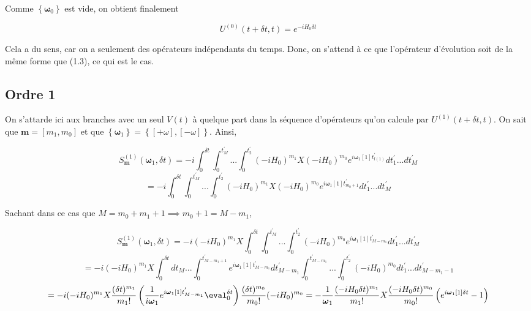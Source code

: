 Comme $\left\{\boldsymbol{\omega}_0\right\}$ est vide, on obtient finalement

\begin{equation}
    U^{(0)}(t+\delta t, t) = e^{-iH_0\delta t}
\end{equation}

Cela a du sens, car on a seulement des opérateurs indépendants du temps. Donc, on s'attend à ce que l'opérateur d'évolution soit de la même forme que (1.3), ce qui est le cas.

\subsection{Ordre 1}
On s'attarde ici aux branches avec un seul $V(t)$ à quelque part dans la séquence d'opérateurs qu'on calcule par $ U^{(1)}(t+\delta t, t)$. On sait que $\boldsymbol{m} = [m_1, m_0]$ et que $\left\{\boldsymbol{\omega}_1\right\} = \left\{[+\omega], [-\omega]\right\}$. Ainsi, 

\begin{equation*}
    S^{(1)}_{\boldsymbol{m}}(\boldsymbol{\omega}_1, \delta t) = -i\int_{0}^{\delta t}\int_{0}^{t_M^{'}}... \int_{0}^{t_2^{'}}(-iH_0)^{m_1}X(-iH_0)^{m_0} e^{i\boldsymbol{\omega}_1[1]t^{'}_{l(1)}}dt_1^{'} ... dt_M^{'}
\end{equation*}
\begin{equation*}
    = -i\int_{0}^{\delta t}\int_{0}^{t_M^{'}}... \int_{0}^{t_2^{'}}(-iH_0)^{m_1}X(-iH_0)^{m_0} e^{i\boldsymbol{\omega}_1[1]t^{'}_{m_0+1}}dt_1^{'} ... dt_M^{'}
\end{equation*}

Sachant dans ce cas que $M = m_0 + m_1 + 1 \implies m_0 + 1 = M-m_1$,

\begin{equation*}
    S^{(1)}_{\boldsymbol{m}}(\boldsymbol{\omega}_1, \delta t) = -i (-iH_0)^{m_1}X
    \int_{0}^{\delta t}\int_{0}^{t_M^{'}}... \int_{0}^{t_2^{'}}(-iH_0)^{m_0} e^{i\boldsymbol{\omega}_1[1]t^{'}_{M-m_1}}dt_1^{'} ... dt_M^{'}
\end{equation*}
\begin{equation*}
    = -i (-iH_0)^{m_1}X
    \int_{0}^{\delta t}dt_M ... \int_{0}^{t^{'}_{M-m_1+1}}e^{i\boldsymbol{\omega}_1[1]t^{'}_{M-m_1}} dt_{M-m_1}^{'}\int_{0}^{t^{'}_{M-m_1}}... \int_{0}^{t_2^{'}}(-iH_0)^{m_0} dt_1^{'} ... dt_{M - m_1 - 1}^{'}
\end{equation*}
\begin{equation*}
    = -i(-iH_0)^{m_1}X\frac{(\delta t)^{m_1}}{m_1!} \left(\frac{1}{i\boldsymbol{\omega}_1}e^{i\boldsymbol{\omega}_1[1]t^{'}_{M-m_1}}\eval_{0}^{\delta t}\right) \frac{(\delta t)^{m_0}}{m_0!}(-iH_0)^{m_0} = -\frac{1}{\boldsymbol{\omega}_1}\frac{(-i H_0 \delta t)^{m_1}}{m_1!}X\frac{(-iH_0 \delta t)^{m_0}}{m_0!}\left(e^{i\boldsymbol{\omega}_1[1]\delta t} - 1\right)
\end{equation*}

